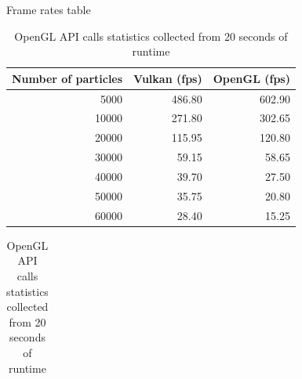 \documentclass[a4paper, 12pt, oneside]{book}
\begin{document}
\begin{landscape}

\begin{table}[ht]
    \centering
    \caption{Frame rates table}
    \label{table:frame rates}
    \begin{tabular} {| r | r | r |}
    
        \hline
        \multicolumn{1}{|c|}{\cellcolor{black!10} Number of particles } & \multicolumn{1}{|c|}{\cellcolor{black!10} Vulkan (fps) } & \multicolumn{1}{|c|}{\cellcolor{black!10} OpenGL (fps) } \\ \hline
         5000   &    486.80   &     602.90    \\ \hline
        10000   &    271.80   &     302.65    \\ \hline
        20000   &    115.95   &     120.80    \\ \hline
        30000   &     59.15   &      58.65    \\ \hline
        40000   &     39.70   &      27.50    \\ \hline
        50000   &     35.75   &      20.80    \\ \hline
        60000   &     28.40   &      15.25    \\ \hline
    \end{tabular}
    
    \bigskip
    
    \caption{OpenGL API calls statistics collected from 20 seconds of runtime}
    \label{table:api time}
    \begin{tabular} {| >{\ttfamily}l | r | r | r | r | r | r |}
    

\end{tabular}
\end{table}
\end{landscape}
\end{document}
